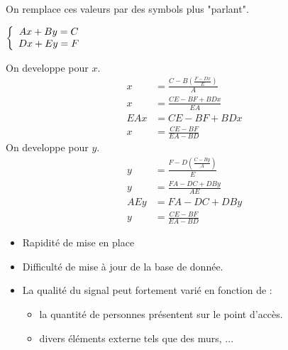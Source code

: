 \documentclass[11pt,a4paper]{article}
\begin{document}
      On remplace ces valeurs par des symbols plus "parlant".
      \begin{center}
        $\left \{
        \begin{array}{c c}
          Ax+By = C \\
          Dx+Ey = F
        \end{array}
        \right.$
      \end{center}
      On developpe pour $x$.
      \begin{align*}
        x &= \frac{C-B(\frac{F-Dx}{E})}{A} \\
        x &= \frac{CE-BF+BDx}{EA} \\
        EAx &= CE-BF+BDx \\
        x &= \frac{CE-BF}{EA-BD}
      \end{align*}
      On developpe pour $y$.
      \begin{align*}
        y &= \frac{F-D(\frac{C-By}{A})}{E} \\
        y &= \frac{FA-DC+DBy}{AE} \\
        AEy &= FA-DC+DBy \\
        y &= \frac{CE-BF}{EA-BD}
      \end{align*}

    \begin{tcolorbox}[title=Avantages :]
      \begin{itemize}
        \item Rapidité de mise en place
      \end{itemize}
    \end{tcolorbox}
    \begin{tcolorbox}[title=Désavantages :]
      \begin{itemize}
        \item Difficulté de mise à jour de la base de donnée.
        \item La qualité du signal peut fortement varié en fonction de :
          \begin{itemize}
            \item la quantité de personnes présentent sur le point d'accès.
            \item divers éléments externe tels que des murs, ...
          \end{itemize}
      \end{itemize}
    \end{tcolorbox}
\end{document}
